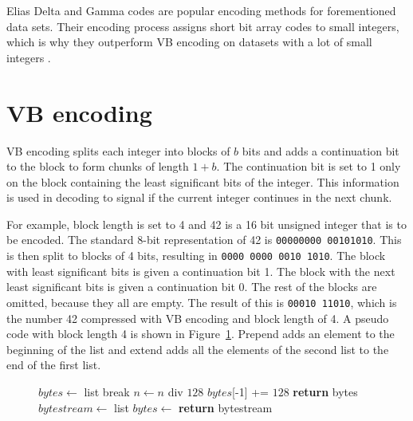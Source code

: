 Elias Delta and Gamma codes \citep{Eli75} are popular encoding methods for forementioned data sets. Their encoding process assigns short bit array codes to small integers, 
which is why they outperform VB encoding on datasets with a lot of small integers .

\section{VB encoding}
VB encoding splits each integer into blocks of $b$ bits and adds a continuation bit to the block to form chunks of length $1+b$. The continuation bit is set to 1 only
on the block containing the least significant bits of the integer. This information is used in decoding to signal if the current integer continues in the next chunk. 

For example, block length is set to 4 and 42 is a 16 bit unsigned integer that is to be encoded. The standard 8-bit representation of 42 is 
\texttt{00000000 00101010}. This is then split to blocks of 4 bits, resulting in \texttt{0000 0000 0010 1010}. The block with least significant bits is given a continuation bit 1.
The block with the next least significant bits is given a continuation bit 0. The rest of the blocks are omitted, because they all are empty. The result of this is \texttt{00010 11010}, 
which is the number 42 compressed with VB encoding and block length of 4. A pseudo code with block length 4 is shown in Figure~\ref{vbyte_enc}. Prepend adds an element to the beginning of the list 
and extend adds all the elements of the second list to the end of the first list.

\begin{figure}[ht]
\centering
  \begin{minipage}{0.5\linewidth}
\begin{algorithmic}[H]
\State $bytes\gets $ list
\State {}
 \State break \EndIf
\State $n\gets n$ div $128$
\EndWhile
\State $bytes$[-1] += $128$
\State \textbf{return} bytes
\EndFunction
\medskip
\medskip
{}
\State $bytestream\gets $ list
\State $bytes \gets$ 
\State {}
\EndFor
\State \textbf{return} bytestream
\EndFunction

\end{algorithmic}
\end{minipage}
 \label{vbyte_enc}
\end{figure}

